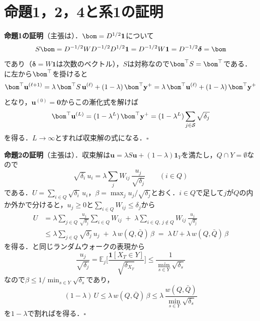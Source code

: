 \section{命題1，2，4と系1の証明}
\label{sec:app_proofs}
\textbf{命題1の証明}（主張は）．$\bom=D^{1/2}\mathbf{1}$について
\begin{equation*}
S\bom=D^{-1/2}WD^{-1/2}D^{1/2}\mathbf{1}=D^{-1/2}W\mathbf{1}=D^{-1/2}\boldsymbol{\delta}=\bom
\end{equation*}
であり（$\boldsymbol{\delta}=W\mathbf{1}$は次数のベクトル），$S$は対称なので$\bom^{\top}S=\bom^{\top}$である．に左から$\bom^{\top}$を掛けると
\begin{equation*}
\bom^{\top}\mathbf{u}^{(\ell+1)}
=\lambda\,\bom^{\top}S\,\mathbf{u}^{(\ell)}+(1-\lambda)\,\bom^{\top}\mathbf{y}^{+}
=\lambda\,\bom^{\top}\mathbf{u}^{(\ell)}+(1-\lambda)\,\bom^{\top}\mathbf{y}^{+}
\end{equation*}
となり，$\mathbf{u}^{(0)}=\mathbf{0}$からこの漸化式を解けば
\begin{equation*}
\bom^{\top}\mathbf{u}^{(L)}=(1-\lambda^{L})\,\bom^{\top}\mathbf{y}^{+}=(1-\lambda^{L})\sum_{j\in\mathcal{S}}\sqrt{\delta_j}
\end{equation*}
を得る．$L\to\infty$とすれば収束解の式になる．$\square$

\appblock
\textbf{命題2の証明}（主張は）．収束解は$\mathbf{u}=\lambda S\mathbf{u}+(1-\lambda)\mathbf{1}_Y$を満たし，$Q\cap Y=\emptyset$なので
\begin{equation*}
\sqrt{\delta_i}\,u_i=\lambda\sum_{j}W_{ij}\,\frac{u_j}{\sqrt{\delta_j}}\qquad(i\in Q)
\end{equation*}
である．$U=\sum_{i\in Q}\sqrt{\delta_i}\,u_i$，$\beta=\max_{j}u_j/\sqrt{\delta_j}$とおく．$i\in Q$で足して$j$が$Q$の内か外かで分けると，$u_j\ge0$と$\sum_{i\in Q}W_{ij}\le\delta_j$から
\begin{align*}
U&=\lambda\sum_{j\in Q}\frac{u_j}{\sqrt{\delta_j}}\sum_{i\in Q}W_{ij}\;+\;\lambda\sum_{i\in Q,\,j\notin Q}W_{ij}\,\frac{u_j}{\sqrt{\delta_j}}\\
&\le\lambda\sum_{j\in Q}\sqrt{\delta_j}\,u_j\;+\;\lambda\,w(Q,\bar{Q})\,\beta
\;=\;\lambda\,U+\lambda\,w(Q,\bar{Q})\,\beta
\end{align*}
を得る．と同じランダムウォークの表現から
\begin{equation*}
\frac{u_j}{\sqrt{\delta_j}}=\mathbb{E}_j\Big[\frac{\mathbf{1}[X_T\in Y]}{\sqrt{\delta_{X_T}}}\Big]\le\frac{1}{\min_{s\in Y}\sqrt{\delta_s}}
\end{equation*}
なので$\beta\le1/\min_{s\in Y}\sqrt{\delta_s}$であり，
\begin{equation*}
(1-\lambda)\,U\le\lambda\,w(Q,\bar{Q})\,\beta\le\lambda\,\frac{w(Q,\bar{Q})}{\min_{s\in Y}\sqrt{\delta_s}}
\end{equation*}
を$1-\lambda$で割ればを得る．$\square$

